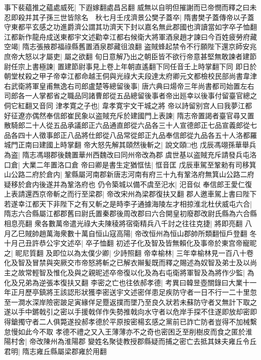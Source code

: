 事下裴藴推之藴處威死|{
	下遐嫁翻處昌呂翻}
威無以自明但摧謝而已帝憫而釋之曰未忍即殺并其子孫三世皆除名　秋七月壬戌濟景公樊子蓋卒|{
	隋書樊子蓋傳帝以子蓋守東都平玄感之功進爵濟公謂其功濟天下封以嘉名無此郡國也濟讀當如字卒子恤翻}
江都新作龍舟成送東都宇文述勸幸江都右候衛大將軍酒泉趙才諫曰今百姓疲勞府藏空竭|{
	隋志張掖郡福祿縣舊置酒泉郡藏徂浪翻}
盗賊蜂起禁令不行願陛下還京師安兆庶帝大怒以才屬吏|{
	屬之欲翻}
旬日意解乃出之朝臣皆不欲行帝意甚堅無敢諫者建節尉任宗上書極諫|{
	置建節尉事見上卷上年朝直遙翻下同任音壬上時掌翻下同}
即日於朝堂杖殺之甲子帝幸江都命越王侗與光祿大夫段達太府卿元文都檢校民部尚書韋津右武衛將軍皇甫無逸右司郎盧楚等總留後事|{
	唐六典曰煬帝三年尚書都司始置左右司郎各一人掌都省之職品同諸曹郎從五品總留後事者帝出廵幸以後事付留臺官總之侗它紅翻又音同}
津孝寛之子也|{
	韋孝寛宇文干城之將}
帝以詩留别宫人曰我夢江都好征遼亦偶然奉信郎崔民象以盗賊充斥於建國門上表諫|{
	隋志帝置謁者臺官尋又置散騎郎二十人從五品承議郎正六品通直郎從六品各三十人宣德郎正七品宣義郎從七品各四十人徵事郎正八品將仕郎從八品常從郎正九品奉信郎從九品各五十人洛都羅城門正南曰建國上時掌翻}
帝大怒先解其頤然後斬之|{
	說文頤□也}
戊辰馮翊孫華舉兵為盗|{
	隋志馮翊郡後魏置華州西魏改曰同州帝改為郡}
虞世基以盗賊充斥請發兵屯洛口倉|{
	大業二年置洛口倉}
帝曰卿是書生定猶恇怯|{
	恇音匡}
戊辰車駕至鞏勑有司移箕山公路二府於倉内|{
	鞏縣屬河南郡新唐志河南有府三十九有鞏洛府無箕山公路二府疑移於倉内後遂并為鞏洛府也}
仍令築城以備不虞至汜水|{
	汜音似}
奉信郎王愛仁復上表請還西京帝斬之而行至梁郡|{
	帝改宋州為梁郡復扶又翻}
郡人邀車駕上書曰陛下若遂幸江都天下非陛下之有又斬之是時李子通據海陵左才相掠淮北杜伏威屯六合|{
	隋志六合縣屬江都郡舊曰尉氏置秦郡後周改郡曰六合開皇初廢郡改尉氏縣為六合縣相息亮翻}
衆各數萬帝遣光祿大夫陳稜將宿衛精兵八千討之往往克捷|{
	將即亮翻}
八月乙巳賊帥趙萬海衆數十萬自恒山寇高陽|{
	帝改恒州為恒山郡帥所類翻恒戶登翻}
冬十月己丑許恭公宇文述卒|{
	卒子恤翻}
初述子化及智及皆無賴化及事帝於東宫帝寵昵之|{
	昵尼質翻}
及即位以為太僕少卿|{
	少詩照翻}
帝幸榆林|{
	三年幸榆林見一百八十卷}
化及智及冒禁與突厥交市帝怒將斬之已解衣辮髪既而釋之賜述為奴智及弟士及以尚主之故常輕智及惟化及與之親昵述卒帝復以化及為右屯衛將軍智及為將作少監|{
	為化及兄弟為逆張本復扶又翻}
李密之亡也往依郝孝德|{
	考異曰韓昱壺關錄曰大業十一年正月歷亭鎮將王該認形狀獲李密送宇文述密佯患足疾防守者一日不行一二十里忽至一澗水深岸險密跛足寅緣佯足蹷返撲而墜乃至良久狀若未蘇防守者又無計下取之遂以手中鏘戟引之密以手援戟佯作失勢推戟向水守者以危岸手探不住遂即放却密即得鎗擉守者二人俱斃遂投郝孝德於平原按密楊玄感之黨前已詐亡防者豈得不加械繫怠慢如此今不取}
孝德不禮之又入王薄薄亦不之奇也密困乏至削樹皮而食之匿於淮陽村舍|{
	帝改陳州為淮陽郡}
變姓名聚徒教授郡縣疑而捕之密亡去抵其妹夫雍丘令丘君明|{
	隋志雍丘縣屬梁郡雍於用翻}
